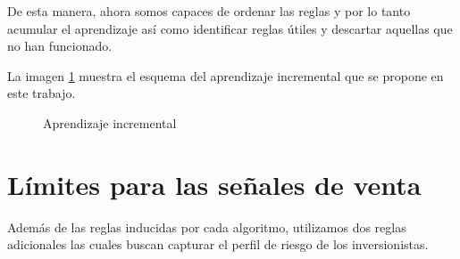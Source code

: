 \documentclass[12pt]{report}
\theoremstyle{break}
\theoremstyle{break}
\begin{document}
De esta manera, ahora somos capaces de ordenar las reglas y por lo tanto acumular el aprendizaje así como identificar reglas útiles y descartar aquellas que no han funcionado.

La imagen \ref{imagen:aprendizaje_incremental} muestra el esquema del aprendizaje incremental que se propone en este trabajo.


\begin{figure}[ht]
\centering
{}
\caption{\label{imagen:aprendizaje_incremental} Aprendizaje incremental}
\end{figure}


\section{Límites para las señales de venta}
\label{seccion:limites ventas}
Además de las reglas inducidas por cada algoritmo, utilizamos dos reglas adicionales las cuales buscan capturar el perfil de riesgo de los inversionistas.
\end{document}
